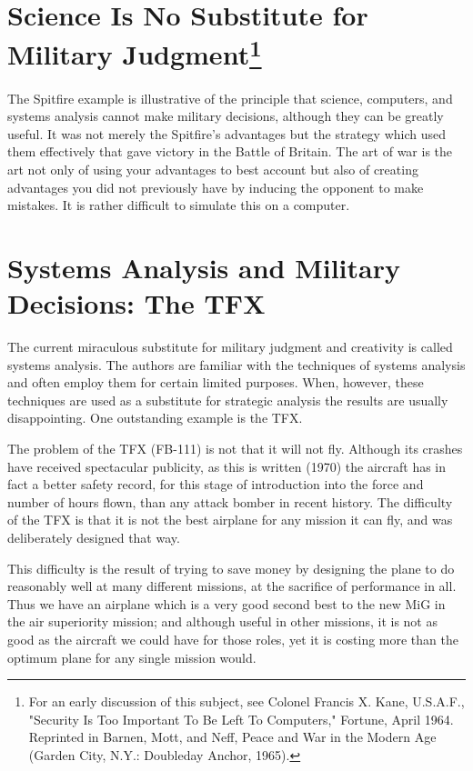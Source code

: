 \section{Science Is No Substitute for Military Judgment\footnote{
    For an early discussion of this subject, see Colonel Francis X. Kane, U.S.A.F., "Security Is Too Important To Be Left To Computers," Fortune, April 1964. Reprinted in Barnen, Mott, and Neff, Peace and War in the Modern Age (Garden City, N.Y.: Doubleday Anchor, 1965).}
}

The Spitfire example is illustrative of the principle that science, computers, and systems analysis cannot make military decisions, although they can be greatly useful. It was not merely the Spitfire's advantages but the strategy which used them effectively that gave victory in the Battle of Britain. The art of war is the art not only of using your advantages to best account but also of creating advantages you did not previously have by inducing the opponent to make mistakes. It is rather difficult to simulate this on a computer.

\section{Systems Analysis and Military Decisions: The TFX}
The current miraculous substitute for military judgment and creativity is called systems analysis. The authors are familiar with the techniques of systems analysis and often employ them for certain limited purposes. When, however, these techniques are used as a substitute for strategic analysis the results are usually disappointing. One outstanding example is the TFX.

The problem of the TFX (FB-111) is not that it will not fly. Although its crashes have received spectacular publicity, as this is written (1970) the aircraft has in fact a better safety record, for this stage of introduction into the force and number of hours flown, than any attack bomber in recent history. The difficulty of the TFX is that it is not the best airplane for any mission it can fly, and was deliberately designed that way.

This difficulty is the result of trying to save money by designing the plane to do reasonably well at many different missions, at the sacrifice of performance in all. Thus we have an airplane which is a very good second best to the new MiG in the air superiority mission; and although useful in other missions, it is not as good as the aircraft we could have for those roles, yet it is costing more than the optimum plane for any single mission would.

